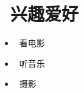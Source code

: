 \documentclass{resume}
\begin{document}
\section{\faSunO\ 兴趣爱好} \vspace{1mm}

\begin{itemize}[parsep=1ex]
  \item \faFilm\ {看电影}
  \item \faHeadphones\ {听音乐}
  \item \faCamera\ {摄影}
\end{itemize}

\end{document}

